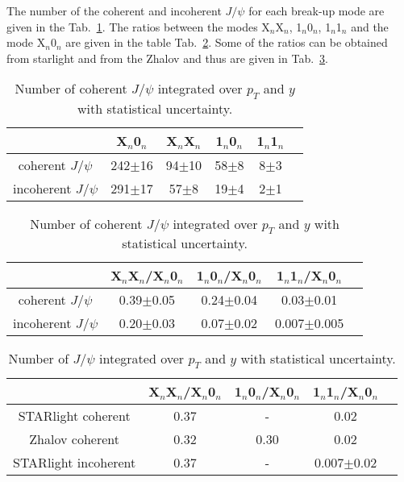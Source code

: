 The number of the coherent and incoherent $J/\psi$ for each break-up mode are given in the Tab.~\ref{tab:r1}. The ratios between the modes X$_{n}$X$_{n}$, 1$_{n}$0$_{n}$, 1$_{n}$1$_{n}$ and  the mode  X$_{n}$0$_{n}$ are given in the table Tab.~\ref{tab:r2}. Some of the  ratios can be obtained from  {\sc starlight} and from the Zhalov and thus are given in Tab.~\ref{tab:r3}.

\begin{table}[h]
\begin{center}
\caption{Number of coherent $J/\psi$ integrated over $p_{T}$ and $y$ with statistical uncertainty.}
\label{tab:r1}
\begin{tabular}{|c|c|c|c|c|c|}
\hline
                               &  X$_{n}$0$_{n}$& X$_{n}$X$_{n}$ & 1$_{n}$0$_{n}$ & 1$_{n}$1$_{n}$  \\ 
\hline
coherent $J/\psi$ &  242$\pm$16&94$\pm$10&58$\pm$8&8$\pm$3\\
\hline
 incoherent $J/\psi$ & 291$\pm$17&57$\pm$8&19$\pm$4&2$\pm$1  \\
\hline
\end{tabular}
\end{center}

\end{table}


\begin{table}[h]
\begin{center}

\caption{Number of coherent $J/\psi$ integrated over $p_{T}$ and $y$ with statistical uncertainty.}
\label{tab:r2}
\begin{tabular}{|c|c|c|c|c|}
\hline
                                 & X$_{n}$X$_{n}$/X$_{n}$0$_{n}$ & 1$_{n}$0$_{n}$/X$_{n}$0$_{n}$ & 1$_{n}$1$_{n}$/X$_{n}$0$_{n}$  \\ 
\hline
coherent $J/\psi$ &  0.39$\pm$0.05&0.24$\pm$0.04&0.03$\pm$0.01\\
\hline
 incoherent $J/\psi$ &  0.20$\pm$0.03&0.07$\pm$0.02&0.007$\pm$0.005 \\
\hline
\end{tabular}
\end{center}

\end{table}


\begin{table}[h]
\begin{center}

\caption{Number of  $J/\psi$ integrated over $p_{T}$ and $y$ with statistical uncertainty.}
\label{tab:r3}
\begin{tabular}{|c|c|c|c|c|}
\hline
                                 & X$_{n}$X$_{n}$/X$_{n}$0$_{n}$ & 1$_{n}$0$_{n}$/X$_{n}$0$_{n}$ & 1$_{n}$1$_{n}$/X$_{n}$0$_{n}$  \\ 
\hline
STARlight coherent &  0.37&-&0.02\\
\hline
Zhalov coherent& 0.32&0.30&0.02\\
\hline
STARlight incoherent &  0.37&-&0.007$\pm$0.02 \\
\hline
\end{tabular}
\end{center}

\end{table}


